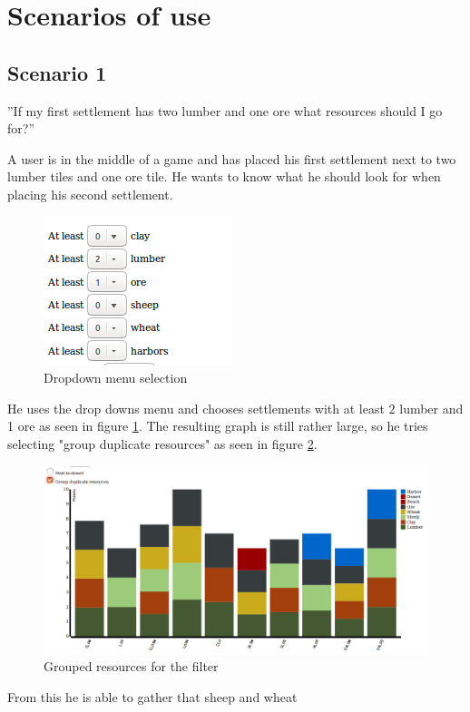 \documentclass[journal]{vgtc}                %
\begin{document}
\section{Scenarios of use}

\subsection{Scenario 1}

”If my first settlement has two lumber and one ore what resources should I go
for?”

A user is in the middle of a game and has placed his first settlement next to
two lumber tiles and one ore tile. He wants to know what he should look for
when placing his second settlement.
\begin{figure}[!ht]
  \centering
  \includegraphics[scale=0.6]{scen1-1.png}
  \caption{Dropdown menu selection}
  \label{fig:s11}
\end{figure}
\noindent
He uses the drop downs menu and chooses settlements with at least 2 lumber
and 1 ore as seen in figure \ref{fig:s11}. The resulting graph is still rather
large, so he tries selecting "group duplicate resources" as seen in figure
\ref{fig:s12}.
\begin{figure}[!ht]
  \centering
  \includegraphics[width=\linewidth]{scen1-2.png}
  \caption{Grouped resources for the filter}
  \label{fig:s12}
\end{figure}
\noindent
From this he is able to gather that sheep and wheat
\end{document}

